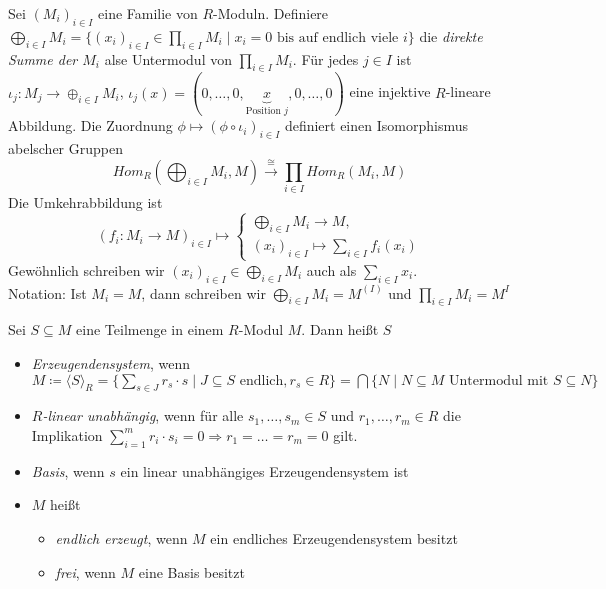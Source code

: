 \documentclass[../main.tex]{subfiles}
\begin{document}
\begin{definition}
    Sei $(M_i)_{i\in I}$ eine Familie von $R$-Moduln. Definiere $\bigoplus_{i\in I} M_i = \{(x_i)_{i\in I}\in \prod_{i\in I} M_i \mid x_i = 0 \text{ bis auf endlich viele $i$}\}$ die \emph{direkte Summe der $M_i$} alse Untermodul von $\prod_{i\in I} M_i$.
    Für jedes $j\in I$ ist $\iota_j : M_j \rightarrow \oplus_{i\in I} M_i$, $\iota_j (x) = (0,\dots, 0,\underbrace{x}_{\text{Position $j$}},0,\dots,0)$ eine injektive $R$-lineare Abbildung.
    Die Zuordnung $\phi \mapsto (\phi \circ \iota_i)_{i\in I}$ definiert einen Isomorphismus abelscher Gruppen
    $$Hom_R \left(\bigoplus_{i\in I} M_i,M\right)\overset{\cong}{\rightarrow} \prod_{i\in I} Hom_R(M_i, M)$$
    Die Umkehrabbildung ist 
    $$(f_i: M_i\rightarrow M)_{i\in I} \mapsto \begin{cases}
        \bigoplus_{i\in I} M_i\rightarrow M,\\
        (x_i)_{i\in I} \mapsto \sum_{i\in I} f_i(x_i)
    \end{cases}$$
    Gewöhnlich schreiben wir $(x_i)_{i\in I} \in \bigoplus_{i\in I} M_i$ auch als $\sum_{i\in I} x_i$.\\
    Notation: Ist $M_i = M$, dann schreiben wir $\bigoplus_{i\in I}M_i = M^{(I)}$ und $\prod_{i\in I} M_i = M^I$
\end{definition}

\begin{definition}
    Sei $S\subseteq M$ eine Teilmenge in einem $R$-Modul $M$. Dann heißt $S$
    \begin{itemize}
        \item \emph{Erzeugendensystem}, wenn $M\coloneqq \langle S\rangle_R = \{\sum_{s\in J} r_s\cdot s \mid J\subseteq S \text{ endlich}, r_s\in R\} = \bigcap\{N\mid N\subseteq M\text{ Untermodul mit }S\subseteq N\}$
        \item \emph{$R$-linear unabhängig}, wenn für alle $s_1,\dots,s_m \in S$ und $r_1,\dots,r_m\in R$ die Implikation $\sum_{i=1}^m r_i\cdot s_i = 0 \Rightarrow r_1 = \dots = r_m = 0$ gilt.
        \item \emph{Basis}, wenn $s$ ein linear unabhängiges Erzeugendensystem ist
        \item $M$ heißt
        \begin{itemize}
            \item \emph{endlich erzeugt}, wenn $M$ ein endliches Erzeugendensystem besitzt
            \item \emph{frei}, wenn $M$ eine Basis besitzt
        \end{itemize}
    \end{itemize}
\end{definition}
\end{document}

